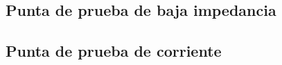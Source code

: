 \documentclass[a4paper,10pt]{article}
\begin{document}
		\subsection{Punta de prueba de baja impedancia}
		\subsection{Punta de prueba de corriente}
		
		
	


	
		
\end{document}
